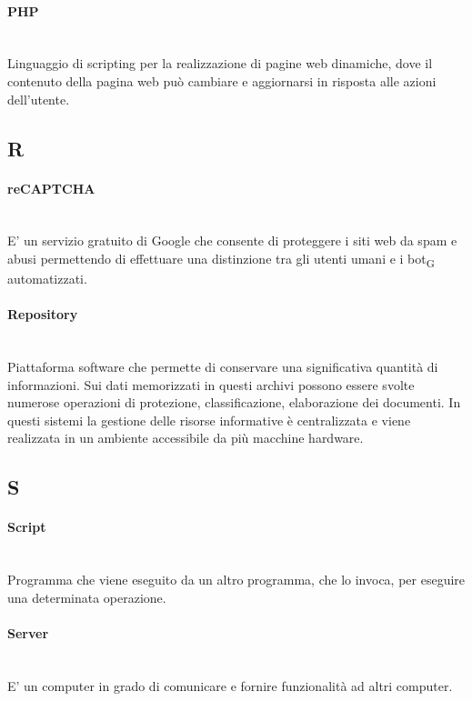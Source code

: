 \paragraph{PHP}~\smallskip \\
Linguaggio di scripting per la realizzazione di pagine web dinamiche, dove il contenuto della pagina web può cambiare e aggiornarsi in risposta alle azioni dell'utente.

\newpage
{}
\subsection*{R}
\paragraph{reCAPTCHA}~\smallskip \\
E' un servizio gratuito di Google che consente di proteggere i siti web da spam e abusi permettendo di effettuare una distinzione tra gli utenti umani e i bot\textsubscript{G} automatizzati.

\paragraph{Repository}~\smallskip \\
Piattaforma software che permette di conservare una significativa quantità di informazioni. Sui dati memorizzati in questi archivi possono essere svolte numerose operazioni di protezione, classificazione, elaborazione dei documenti. In questi sistemi la gestione delle risorse informative è centralizzata e viene realizzata in un ambiente accessibile da più macchine hardware.

\newpage
{}
\subsection*{S}
\paragraph{Script}~\smallskip \\
Programma che viene eseguito da un altro programma, che lo invoca, per eseguire una determinata operazione.

\paragraph{Server}~\smallskip \\
E' un computer in grado di comunicare e fornire funzionalità ad altri computer.

